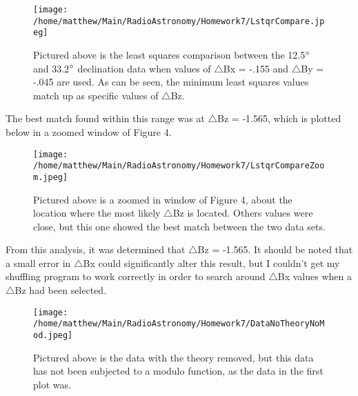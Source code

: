 \documentclass{article}
\begin{document}
\begin{figure}[H]
\centering
\texttt{[image: /home/matthew/Main/RadioAstronomy/Homework7/LstqrCompare.jpeg]}
\caption{Pictured above is the least squares comparison between the 12.5$\degree$ and 33.2$\degree$ declination data when values of $\triangle$Bx = -.155 and $\triangle$By = -.045 are used.  As can be seen, the minimum least squares values match up as specific values of $\triangle$Bz.}
\end{figure}

The best match found within this range was at $\triangle$Bz = -1.565, which is plotted below in a zoomed window of Figure 4.

\begin{figure}[H]
\centering
\texttt{[image: /home/matthew/Main/RadioAstronomy/Homework7/LstqrCompareZoom.jpeg]}
\caption{Pictured above is a zoomed in window of Figure 4, about the location where the most likely $\triangle$Bz is located.  Others values were close, but this one showed the best match between the two data sets.}
\end{figure}

From this analysis, it was determined that $\triangle$Bz = -1.565.  It should be noted that a small error in $\triangle$Bx could significantly alter this result, but I couldn't get my shuffling program to work correctly in order to search around $\triangle$Bx values when a $\triangle$Bz had been selected.

\begin{figure}[H]
\centering
\texttt{[image: /home/matthew/Main/RadioAstronomy/Homework7/DataNoTheoryNoMod.jpeg]}
\caption{Pictured above is the data with the theory removed, but this data has not been subjected to a modulo function, as the data in the first plot was.}
\end{figure}
\end{document}
